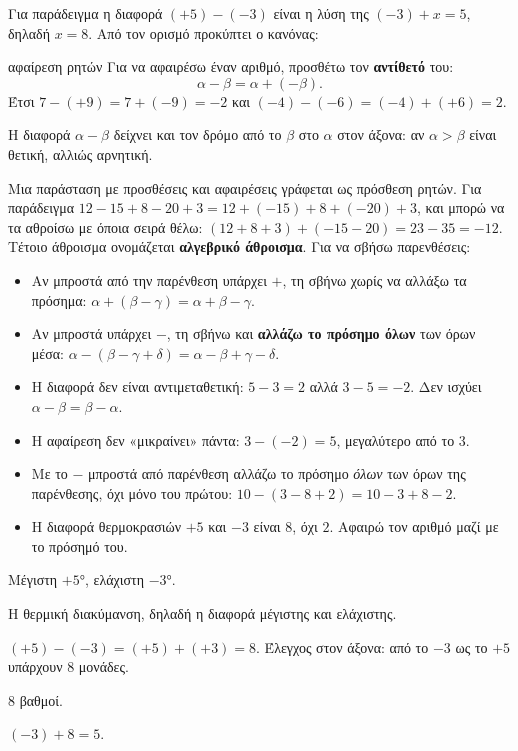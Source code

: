 Για παράδειγμα η διαφορά $(+5)-(-3)$ είναι η λύση της $(-3)+x=5$, δηλαδή $x=8$. Από τον ορισμό προκύπτει ο κανόνας:

\begin{kanonas}{αφαίρεση ρητών}
Για να αφαιρέσω έναν αριθμό, προσθέτω τον \textbf{αντίθετό} του: $$\alpha-\beta=\alpha+(-\beta).$$ Έτσι $7-(+9)=7+(-9)=-2$ και $(-4)-(-6)=(-4)+(+6)=2$.
\end{kanonas}

Η διαφορά $\alpha-\beta$ δείχνει και τον δρόμο από το $\beta$ στο $\alpha$ στον άξονα: αν $\alpha>\beta$ είναι θετική, αλλιώς αρνητική.


Μια παράσταση με προσθέσεις και αφαιρέσεις γράφεται ως πρόσθεση ρητών. Για παράδειγμα $12-15+8-20+3=12+(-15)+8+(-20)+3$, και μπορώ να τα αθροίσω με όποια σειρά θέλω: $(12+8+3)+(-15-20)=23-35=-12$. Τέτοιο άθροισμα ονομάζεται \textbf{αλγεβρικό άθροισμα}. Για να σβήσω παρενθέσεις:
\begin{itemize}[leftmargin=1.2em,itemsep=0.3ex,topsep=2pt]
\item Αν μπροστά από την παρένθεση υπάρχει $+$, τη σβήνω χωρίς να αλλάξω τα πρόσημα: $\alpha+(\beta-\gamma)=\alpha+\beta-\gamma$.
\item Αν μπροστά υπάρχει $-$, τη σβήνω και \textbf{αλλάζω το πρόσημο όλων} των όρων μέσα: $\alpha-(\beta-\gamma+\delta)=\alpha-\beta+\gamma-\delta$.
\end{itemize}

\begin{prosoxi}
\begin{itemize}[leftmargin=1.2em,itemsep=0.3ex,topsep=2pt]
\item Η διαφορά δεν είναι αντιμεταθετική: $5-3=2$ αλλά $3-5=-2$. Δεν ισχύει $\alpha-\beta=\beta-\alpha$.
\item Η αφαίρεση δεν «μικραίνει» πάντα: $3-(-2)=5$, μεγαλύτερο από το $3$.
\item Με το $-$ μπροστά από παρένθεση αλλάζω το πρόσημο \emph{όλων} των όρων της παρένθεσης, όχι μόνο του πρώτου: $10-(3-8+2)=10-3+8-2$.
\item Η διαφορά θερμοκρασιών $+5$ και $-3$ είναι $8$, όχι $2$. Αφαιρώ τον αριθμό μαζί με το πρόσημό του.
\end{itemize}
\end{prosoxi}


\tixero Μέγιστη $+5$°, ελάχιστη $-3$°.\par
\tithelo Η θερμική διακύμανση, δηλαδή η διαφορά μέγιστης και ελάχιστης.\par
\possindeo $(+5)-(-3)=(+5)+(+3)=8$. Έλεγχος στον άξονα: από το $-3$ ως το $+5$ υπάρχουν $8$ μονάδες.\par
\apantisi $8$ βαθμοί.\par
\elegxos $(-3)+8=5$.

